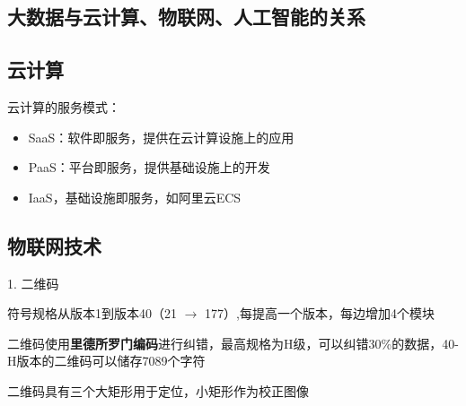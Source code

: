 \subsection{大数据与云计算、物联网、人工智能的关系}%
\label{sub:大数据与云计算、物联网、人工智能的关系}
\subsection{云计算}%
\label{sub:云计算}
云计算的服务模式：
\begin{itemize}
    \item SaaS：软件即服务，提供在云计算设施上的应用
    \item PaaS：平台即服务，提供基础设施上的开发
    \item IaaS，基础设施即服务，如阿里云ECS
\end{itemize}
\subsection{物联网技术}%
\label{sub:物联网技术}
1. 二维码
\begin{notation}
    符号规格从版本1到版本40（21 $\to $ 177）,每提高一个版本，每边增加4个模块

    二维码使用\textbf{里德所罗门编码}进行纠错，最高规格为H级，可以纠错30\%的数据，40-H版本的二维码可以储存7089个字符

    二维码具有三个大矩形用于定位，小矩形作为校正图像
\end{notation}

